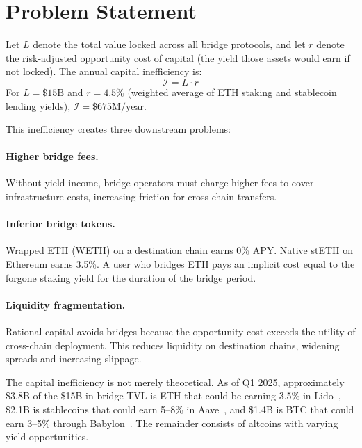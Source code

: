 \section{Problem Statement}
\label{sec:problem}

\begin{definition}
Let $L$ denote the total value locked across all bridge protocols, and let $r$ denote the risk-adjusted opportunity cost of capital (the yield those assets would earn if not locked). The annual capital inefficiency is:
\begin{equation}\label{eq:inefficiency}
  \mathcal{I} = L \cdot r
\end{equation}
For $L = \$15\text{B}$ and $r = 4.5\%$ (weighted average of ETH staking and stablecoin lending yields), $\mathcal{I} = \$675\text{M/year}$.
\end{definition}

This inefficiency creates three downstream problems:

\paragraph{Higher bridge fees.} Without yield income, bridge operators must charge higher fees to cover infrastructure costs, increasing friction for cross-chain transfers.

\paragraph{Inferior bridge tokens.} Wrapped ETH (WETH) on a destination chain earns 0\% APY. Native stETH on Ethereum earns 3.5\%. A user who bridges ETH pays an implicit cost equal to the forgone staking yield for the duration of the bridge period.

\paragraph{Liquidity fragmentation.} Rational capital avoids bridges because the opportunity cost exceeds the utility of cross-chain deployment. This reduces liquidity on destination chains, widening spreads and increasing slippage.

\begin{remark}
The capital inefficiency is not merely theoretical. As of Q1 2025, approximately \$3.8B of the \$15B in bridge TVL is ETH that could be earning 3.5\% in Lido~\cite{lidofinance}, \$2.1B is stablecoins that could earn 5--8\% in Aave~\cite{aavev3}, and \$1.4B is BTC that could earn 3--5\% through Babylon~\cite{babylon2024}. The remainder consists of altcoins with varying yield opportunities.
\end{remark}

